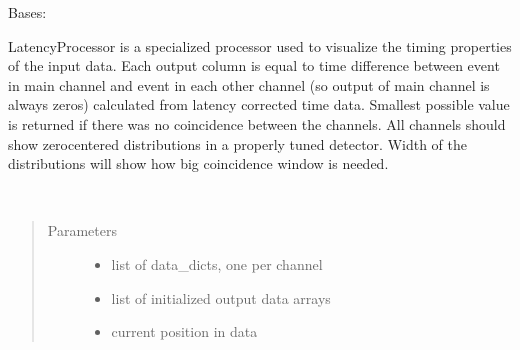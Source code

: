 \documentclass[letterpaper,10pt,english]{sphinxmanual}
\begin{document}

\begin{fulllineitems}
\label{\detokenize{autodocs/data:listmode.data.LatencyProcessor}}
\sphinxAtStartPar
Bases: {\hyperref[\detokenize{autodocs/data:listmode.data.ColProcessor}]{}}

\sphinxAtStartPar
LatencyProcessor is a specialized processor used to visualize the timing properties of the input data. Each
output column is equal to time difference between event in main channel and event in each other channel
(so output of main channel is always zeros) calculated from latency corrected time data. Smallest possible value is
returned if there was no coincidence between the channels. All channels should show zero\sphinxhyphen{}centered distributions
in a properly tuned detector. Width of the distributions will show how big coincidence window is needed.

\begin{fulllineitems}
\label{\detokenize{autodocs/data:listmode.data.LatencyProcessor.process}}~\begin{quote}\begin{description}
\item[{Parameters}] \leavevmode\begin{itemize}
\item {} 
\sphinxAtStartPar
{} \textendash{} list of data\_dicts, one per channel

\item {} 
\sphinxAtStartPar
{} \textendash{} list of initialized output data arrays

\item {} 
\sphinxAtStartPar
{} \textendash{} current position in data


\end{itemize}
\end{description}
\end{quote}
\end{fulllineitems}
\end{fulllineitems}
\end{document}
